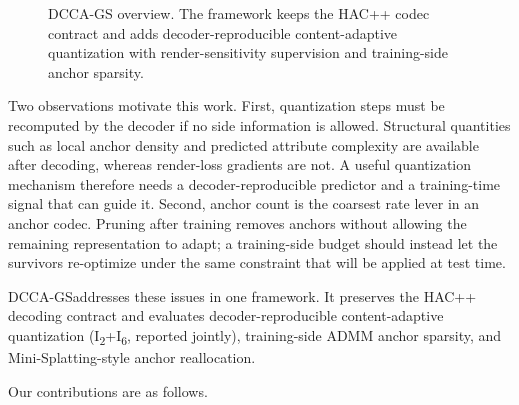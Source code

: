 \documentclass{article}
\newcommand{\DCCA}{DCCA-GS}
\newcommand{\Itwo}{I\textsubscript{2}}
\newcommand{\Isix}{I\textsubscript{6}}
\begin{document}
\begin{figure}[t]
\centering
\caption{DCCA-GS overview. The framework keeps the HAC++ codec contract and adds decoder-reproducible content-adaptive quantization with render-sensitivity supervision and training-side anchor sparsity.}
\label{fig:overview}
\end{figure}

Two observations motivate this work. First, quantization steps must be recomputed by the decoder if no side information is allowed. Structural quantities such as local anchor density and predicted attribute complexity are available after decoding, whereas render-loss gradients are not. A useful quantization mechanism therefore needs a decoder-reproducible predictor and a training-time signal that can guide it. Second, anchor count is the coarsest rate lever in an anchor codec. Pruning after training removes anchors without allowing the remaining representation to adapt; a training-side budget should instead let the survivors re-optimize under the same constraint that will be applied at test time.

\DCCA addresses these issues in one framework. It preserves the HAC++ decoding contract and evaluates decoder-reproducible content-adaptive quantization (\Itwo+\Isix, reported jointly), training-side ADMM anchor sparsity, and Mini-Splatting-style anchor reallocation.

Our contributions are as follows.
\end{document}
